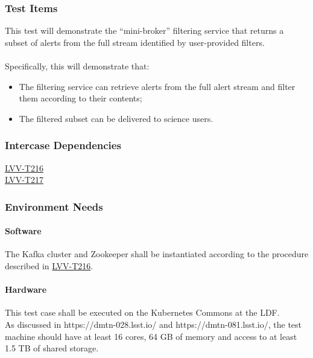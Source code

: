 \subsubsection{Test Items}
This test will demonstrate the ``mini-broker'' filtering service that
returns a subset of alerts from the full stream identified by
user-provided filters.\\
~\\
Specifically, this will demonstrate that:\\

\begin{itemize}
\tightlist
\item
  The filtering service can retrieve alerts from the full alert stream
  and filter them according to their contents; ~ ~
\item
  The filtered subset can be delivered to science users.
\end{itemize}



\subsubsection{Intercase Dependencies}
​\href{https://jira.lsstcorp.org/secure/Tests.jspa\#/testCase/LVV-T216}{LVV-T216}​​​\\
​\href{https://jira.lsstcorp.org/secure/Tests.jspa\#/testCase/LVV-T217}{LVV-T217}​​​


\subsubsection{Environment Needs}

\paragraph{Software}
The Kafka cluster and Zookeeper shall be instantiated according to the
procedure described in
\href{https://jira.lsstcorp.org/secure/Tests.jspa\#/testCase/LVV-T216}{LVV-T216}.


\paragraph{Hardware}
This test case shall be executed on the Kubernetes Commons at the LDF.\\
As discussed in https://dmtn-028.lsst.io/ and https://dmtn-081.lsst.io/,
the test machine should have at least 16 cores, 64 GB of memory and
access to at least 1.5 TB of shared storage.


